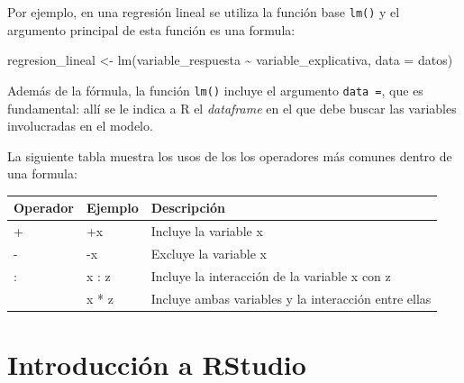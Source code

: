 \documentclass[
  spanish,
  a4paper,
]{scrbook}
\newenvironment{Shaded}{\begin{snugshade}}{\end{snugshade}}
\newcommand{\AttributeTok}[1]{\textcolor[rgb]{0.40,0.45,0.13}{#1}}
\newcommand{\FunctionTok}[1]{\textcolor[rgb]{0.28,0.35,0.67}{#1}}
\newcommand{\NormalTok}[1]{\textcolor[rgb]{0.00,0.23,0.31}{#1}}
\newcommand{\OtherTok}[1]{\textcolor[rgb]{0.00,0.23,0.31}{#1}}
\newcommand{\SpecialCharTok}[1]{\textcolor[rgb]{0.37,0.37,0.37}{#1}}
\newcounter{none} %
\begin{document}
Por ejemplo, en una regresión lineal se utiliza la función base
\texttt{lm()} y el argumento principal de esta función es una formula:

\begin{Shaded}
\begin{Highlighting}[]
\NormalTok{regresion\_lineal }\OtherTok{\textless{}{-}} \FunctionTok{lm}\NormalTok{(variable\_respuesta }\SpecialCharTok{\textasciitilde{}}\NormalTok{ variable\_explicativa, }\AttributeTok{data =}\NormalTok{ datos)}
\end{Highlighting}
\end{Shaded}

Además de la fórmula, la función \texttt{lm()} incluye el argumento
\texttt{data\ =}, que es fundamental: allí se le indica a R el
\emph{dataframe} en el que debe buscar las variables involucradas en el
modelo.

La siguiente tabla muestra los usos de los los operadores más comunes
dentro de una formula:

{\def\LTcaptype{none} %
\begin{longtable}[]{@{}
  >{\raggedright\arraybackslash}p{}
  >{\raggedright\arraybackslash}p{}
  >{\raggedright\arraybackslash}p{}@{}}
\toprule\noalign{}
\begin{minipage}[b]{\linewidth}\raggedright
Operador
\end{minipage} & \begin{minipage}[b]{\linewidth}\raggedright
Ejemplo
\end{minipage} & \begin{minipage}[b]{\linewidth}\raggedright
Descripción
\end{minipage} \\
\midrule\noalign{}
\endhead
\bottomrule\noalign{}
\endlastfoot
+ & +x & Incluye la variable x \\
- & -x & Excluye la variable x \\
: & x : z & Incluye la interacción de la variable x con z \\
* & x * z & Incluye ambas variables y la interacción entre ellas \\
\end{longtable}
}

\chapter{Introducción a RStudio}\label{introducciuxf3n-a-rstudio}
\end{document}

